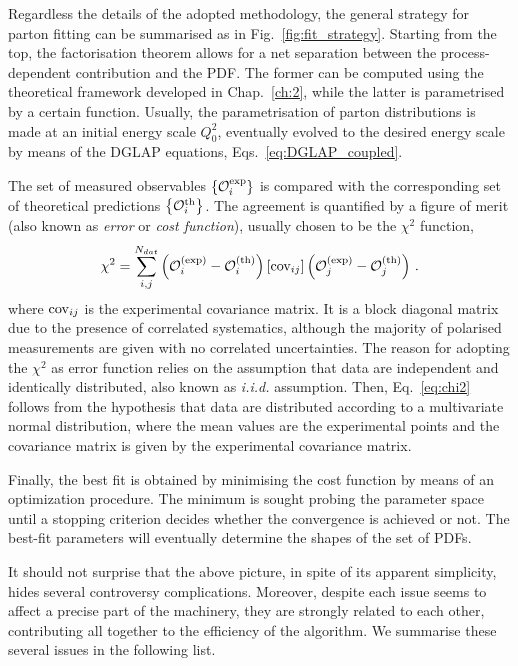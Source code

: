 Regardless the details of the adopted methodology, the general strategy for parton fitting can be summarised as in Fig.~\ref{fig:fit_strategy}. Starting from the top, the factorisation theorem allows for a net separation between the process-dependent contribution and the PDF. The former can be computed using the theoretical framework developed in Chap.~\ref{ch:2}, while the latter is parametrised by a certain function. Usually, the parametrisation of parton distributions is made at an initial energy scale $Q_0^2$, eventually evolved to the desired energy scale by means of the DGLAP equations, Eqs.~\eqref{eq:DGLAP_coupled}.\par
The set of measured observables $\left\{ \mathcal{O}^{\textrm{exp}}_i \right\}$ is compared with the corresponding set of theoretical predictions $\left\{ \mathcal{O}^{\textrm{th}}_i \right\}$. The agreement is quantified by a figure of merit (also known as \textit{error} or \textit{cost function}), usually chosen to be the $\chi^2$ function,
\begin{equation}
  \chi^2 = \sum_{i,j}^{N_{dat}} \left( \mathcal{O}_{i}^{\textrm{(exp)}} - \mathcal{O}_{i}^{\textrm{(th)}} \right) \left[ \textrm{cov}_{ij} \right] \left( \mathcal{O}_{j}^{\textrm{(exp)}} - \mathcal{O}_{j}^{\textrm{(th)}}  \right) \,.
  \label{eq:chi2}
\end{equation}  
where $\textrm{cov}_{ij}$ is the experimental covariance matrix. It is a block diagonal matrix due to the presence of correlated systematics, although the majority of polarised measurements are given with no correlated uncertainties. The reason for adopting the $\chi^2$ as error function relies on the assumption that data are independent and identically distributed, also known as \textit{i.i.d.} assumption. Then, Eq.~\eqref{eq:chi2} follows from the hypothesis that data are distributed according to a multivariate normal distribution, where the mean values are the experimental points and the covariance matrix is given by the experimental covariance matrix.\par
Finally, the best fit is obtained by minimising the cost function by means of an optimization procedure. The minimum is sought probing the parameter space until a stopping criterion decides whether the convergence is achieved or not. The best-fit parameters will eventually determine the shapes of the set of PDFs.\par
It should not surprise that the above picture, in spite of its apparent simplicity, hides several controversy complications. Moreover, despite each issue seems to  affect a precise part of the machinery, they are strongly related to each other, contributing all together to the efficiency of the algorithm. We summarise these several issues in the following list.\\[10pt]
